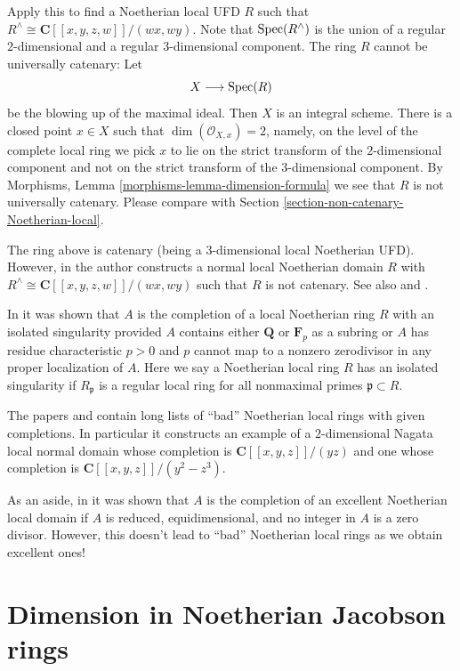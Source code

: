 \medskip\noindent
Apply this to find a Noetherian local UFD $R$ such that
$R^\wedge \cong \mathbf{C}[[x, y, z, w]]/(wx, wy)$.
Note that $\mathop{\mathrm{Spec}}(R^\wedge)$ is the
union of a regular $2$-dimensional and a regular $3$-dimensional component.
The ring $R$ cannot be universally catenary: Let
$$
X \longrightarrow \mathop{\mathrm{Spec}}(R)
$$
be the blowing up of the maximal ideal. Then $X$ is an integral scheme.
There is a closed point $x \in X$ such that $\dim(\mathcal{O}_{X, x}) = 2$,
namely, on the level of the complete local ring we pick $x$ to lie on the
strict transform of the $2$-dimensional component and not on the strict
transform of the $3$-dimensional component. By
Morphisms, Lemma \ref{morphisms-lemma-dimension-formula}
we see that $R$ is not universally catenary. Please compare with
Section \ref{section-non-catenary-Noetherian-local}.

\medskip\noindent
The ring above is catenary (being a $3$-dimensional local Noetherian UFD).
However, in \cite{Ogoma-example} the author constructs a normal local
Noetherian domain $R$ with $R^\wedge \cong \mathbf{C}[[x, y, z, w]]/(wx, wy)$
such that $R$ is not catenary. See also \cite{Heitmann-Ogoma} and
\cite{Lech-YAPO}.

\medskip\noindent
In \cite{Heitmann-isolated} it was shown that $A$ is the completion
of a local Noetherian ring $R$ with an isolated singularity
provided $A$ contains either $\mathbf{Q}$ or $\mathbf{F}_p$ as a subring
or $A$ has residue characteristic $p > 0$ and $p$ cannot map to a
nonzero zerodivisor in any proper localization of $A$.
Here we say a Noetherian local ring $R$
has an isolated singularity if $R_\mathfrak p$ is
a regular local ring for all nonmaximal primes $\mathfrak p \subset R$.

\medskip\noindent
The papers \cite{Nishimura-few} and \cite{Nishimura-few-II}
contain long lists of ``bad'' Noetherian
local rings with given completions. In particular it constructs
an example of a $2$-dimensional Nagata local normal domain whose
completion is $\mathbf{C}[[x, y, z]]/(yz)$ and one whose completion
is $\mathbf{C}[[x, y, z]]/(y^2 - z^3)$.

\medskip\noindent
As an aside, in \cite{Loepp} it was shown that $A$ is the completion of an
excellent Noetherian local domain if $A$ is reduced, equidimensional,
and no integer in $A$ is a zero divisor. However, this doesn't lead
to ``bad'' Noetherian local rings as we obtain excellent ones!




\section{Dimension in Noetherian Jacobson rings}
\label{section-noetherian-jacobson}

